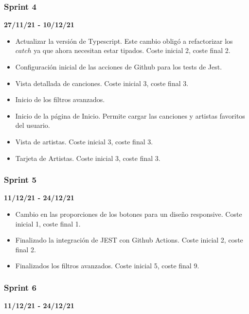 \subsubsection{Sprint 4}
\textbf{27/11/21 - 10/12/21}

\begin{itemize}
    \item Actualizar la versión de Typescript. Este cambio obligó a refactorizar los $catch$ ya que ahora necesitan estar tipados. Coste inicial 2, coste final 2.
    \item Configuración inicial de las acciones de Github para los tests de Jest. 
    \item Vista detallada de canciones. Coste inicial 3, coste final 3.
    \item Inicio de los filtros avanzados. 
    \item Inicio de la página de Inicio. Permite cargar las canciones y artistas favoritos del usuario. 
    \item Vista de artistas. Coste inicial 3, coste final 3. 
    \item Tarjeta de Artistas. Coste inicial 3, coste final 3. 
\end{itemize}


\subsubsection{Sprint 5}
\textbf{11/12/21 - 24/12/21}

\begin{itemize}
    \item Cambio en las proporciones de los botones para un diseño responsive. Coste inicial 1, coste final 1.
    \item Finalizado la integración de JEST con Github Actions. Coste inicial 2, coste final 2.
    \item Finalizados los filtros avanzados. Coste inicial 5, coste final 9.
\end{itemize}


\subsubsection{Sprint 6}
\textbf{11/12/21 - 24/12/21}

